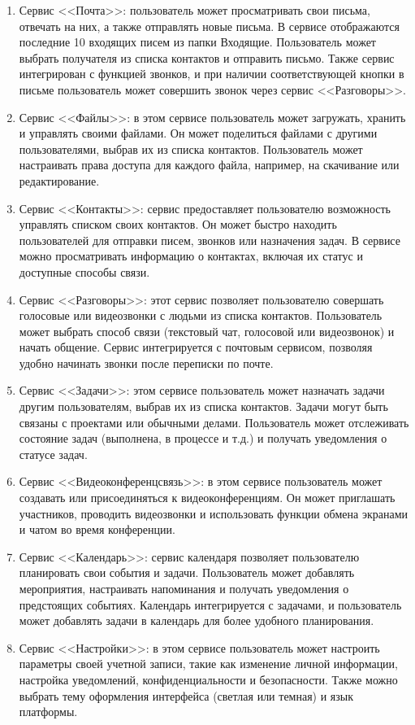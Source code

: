 \begin{enumerate}
    \item Сервис <<Почта>>: пользователь может просматривать свои письма, отвечать на них, а также отправлять новые письма. В сервисе отображаются последние 10 входящих писем из папки Входящие. Пользователь может выбрать получателя из списка контактов и отправить письмо. Также сервис интегрирован с функцией звонков, и при наличии соответствующей кнопки в письме пользователь может совершить звонок через сервис <<Разговоры>>.
    
    \item Сервис <<Файлы>>: в этом сервисе пользователь может загружать, хранить и управлять своими файлами. Он может поделиться файлами с другими пользователями, выбрав их из списка контактов. Пользователь может настраивать права доступа для каждого файла, например, на скачивание или редактирование.

    \item Сервис <<Контакты>>: сервис предоставляет пользователю возможность управлять списком своих контактов. Он может быстро находить пользователей для отправки писем, звонков или назначения задач. В сервисе можно просматривать информацию о контактах, включая их статус и доступные способы связи.

    \item Сервис <<Разговоры>>: этот сервис позволяет пользователю совершать голосовые или видеозвонки с людьми из списка контактов. Пользователь может выбрать способ связи (текстовый чат, голосовой или видеозвонок) и начать общение. Сервис интегрируется с почтовым сервисом, позволяя удобно начинать звонки после переписки по почте.

    \item Сервис <<Задачи>>: этом сервисе пользователь может назначать задачи другим пользователям, выбрав их из списка контактов. Задачи могут быть связаны с проектами или обычными делами. Пользователь может отслеживать состояние задач (выполнена, в процессе и т.д.) и получать уведомления о статусе задач.

    \item Сервис <<Видеоконференцсвязь>>: в этом сервисе пользователь может создавать или присоединяться к видеоконференциям. Он может приглашать участников, проводить видеозвонки и использовать функции обмена экранами и чатом во время конференции.

    \item Сервис <<Календарь>>: сервис календаря позволяет пользователю планировать свои события и задачи. Пользователь может добавлять мероприятия, настраивать напоминания и получать уведомления о предстоящих событиях. Календарь интегрируется с задачами, и пользователь может добавлять задачи в календарь для более удобного планирования.

    \item Сервис <<Настройки>>: в этом сервисе пользователь может настроить параметры своей учетной записи, такие как изменение личной информации, настройка уведомлений, конфиденциальности и безопасности. Также можно выбрать тему оформления интерфейса (светлая или темная) и язык платформы.
\end{enumerate}

